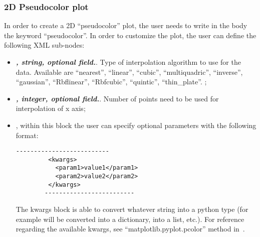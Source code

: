 \subsubsection{2D Pseudocolor plot}
In order to create a 2D ``pseudocolor'' plot, the user needs to write in the
 body the keyword ``pseudocolor''.
%
In order to customize the plot, the user can define the following XML sub-nodes:
  \begin{itemize}
  \item {}\textbf{\textit{, string, optional field.}}.
  Type of interpolation algorithm to use for the data.
  Available are ``nearest'', ``linear'', ``cubic'', ``multiquadric'',
  ``inverse'', ``gaussian'', ``Rbflinear'', ``Rbfcubic'', ``quintic'',
  ``thin\_plate''.
  ;
  \item {}\textbf{\textit{, integer, optional field.}}.
  Number of points need to be used for interpolation of x axis;
  \item \textit{}, within this block the user can specify optional
  parameters with the following format:
        \begin{lstlisting}[style=XML]
        --------------------------
         <kwargs>
           <param1>value1</param1>
           <param2>value2</param2>
         </kwargs>
        -------------------------
       \end{lstlisting}
  The kwargs block is able to convert whatever string into a python type (for
  example  will be converted into a
  dictionary,  into a list, etc.).
  For reference regarding the available kwargs, see ``matplotlib.pyplot.pcolor''
  method in~\cite{MatPlotLib}.
    \end{itemize}

